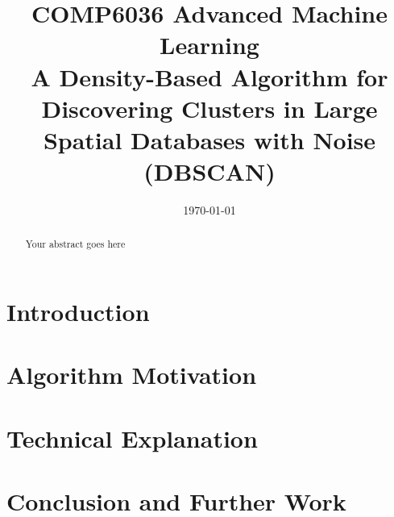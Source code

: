 \documentclass{ecsarticle}     %
\begin{document}
\frontmatter
\title      {COMP6036 Advanced Machine Learning\\[1cm]
            A Density-Based Algorithm for Discovering Clusters in Large Spatial Databases with Noise (DBSCAN)}
      
\addresses  {\deptname\\\univname}

\date       {\today}
\subject    {}
\keywords   {}
\maketitle



\begin{abstract}
Your abstract goes here
\end{abstract}

\mainmatter


\section{Introduction}
\section{Algorithm Motivation}
\section{Technical Explanation}
\section{Conclusion and Further Work}
\end{document}
